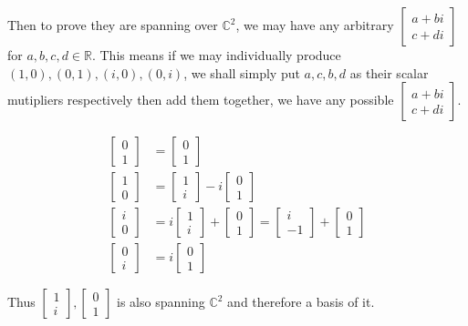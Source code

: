 \documentclass[11pt]{article}
\providecommand{\qbm}[1]{\begin{bmatrix} #1 \end{bmatrix}}
\begin{document}
Then to prove they are spanning over $\mathbb{C}^2$, we may have any arbitrary $\begin{bmatrix} a + bi \\ c + di \end{bmatrix}$ for $a, b, c, d \in \mathbb{R}$. This means if we may individually produce $(1, 0), (0, 1), (i, 0), (0, i)$, we shall simply put $a, c, b, d$ as their scalar mutipliers respectively then add them together, we have any possible $\begin{bmatrix} a + bi \\ c + di \end{bmatrix}$.

\begin{align*}
    \qbm{0 \\ 1} &= \qbm{0 \\ 1} \\
    \qbm{1 \\ 0} &= \qbm{1 \\ i} - i\qbm{0 \\ 1} \\
    \qbm{i \\ 0} &= i\qbm{1 \\ i} + \qbm{0 \\ 1} = \qbm{i \\ -1} + \qbm{0 \\ 1} \\
    \qbm{0 \\ i} &=  i\qbm{0 \\ 1}
\end{align*}

Thus $\qbm{1 \\ i}, \qbm{0 \\ 1}$ is also spanning $\mathbb{C}^2$ and therefore a basis of it.
\end{document}
